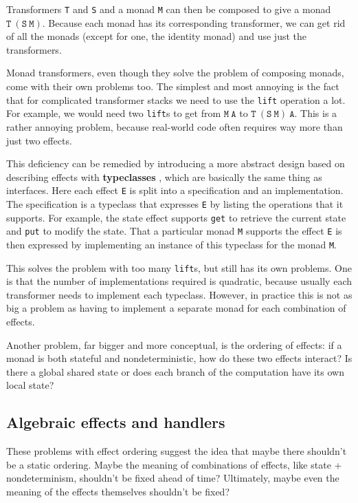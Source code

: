 \documentclass[declaration,inz,english,shortabstract]{iithesis}
\newcommand{\m}[1]{\texttt{#1}}
\begin{document}
Transformers \m{T} and \m{S} and a monad \m{M} can then be composed to give a monad $\m{T}\ (\m{S}\ \m{M})$. Because each monad has its corresponding transformer, we can get rid of all the monads (except for one, the identity monad) and use just the transformers.

Monad transformers, even though they solve the problem of composing monads, come with their own problems too. The simplest and most annoying
is the fact that for complicated transformer stacks we need to use the \m{lift} operation a lot. For example, we would need two \m{lift}s to get from $\m{M}\ \m{A}$ to $\m{T}\ (\m{S}\ \m{M})\ \m{A}$. This is a rather annoying problem, because real-world code often requires way more than just two effects.

This deficiency can be remedied by introducing a more abstract design based on describing effects with \textbf{typeclasses} \cite{mtl}, which are basically the same thing as interfaces. Here each effect \m{E} is split into a specification and an implementation. The specification is a typeclass that expresses \m{E} by listing the operations that it supports. For example, the state effect supports \m{get} to retrieve the current state and \m{put} to modify the state. That a particular monad \m{M} supports the effect \m{E} is then expressed by implementing an instance of this typeclass for the monad \m{M}.

This solves the problem with too many \m{lift}s, but still has its own problems. One is that the number of implementations required is quadratic, because usually each transformer needs to implement each typeclass. However, in practice this is not as big a problem as having to implement a separate monad for each combination of effects.

Another problem, far bigger and more conceptual, is the ordering of effects: if a monad is both stateful and nondeterministic, how do these two effects interact? Is there a global shared state or does each branch of the computation have its own local state?

\subsection{Algebraic effects and handlers}

These problems with effect ordering suggest the idea that maybe there shouldn't be a static ordering. Maybe the meaning of combinations of effects, like state + nondeterminism, shouldn't be fixed ahead of time? Ultimately, maybe even the meaning of the effects themselves shouldn't be fixed?
\end{document}
